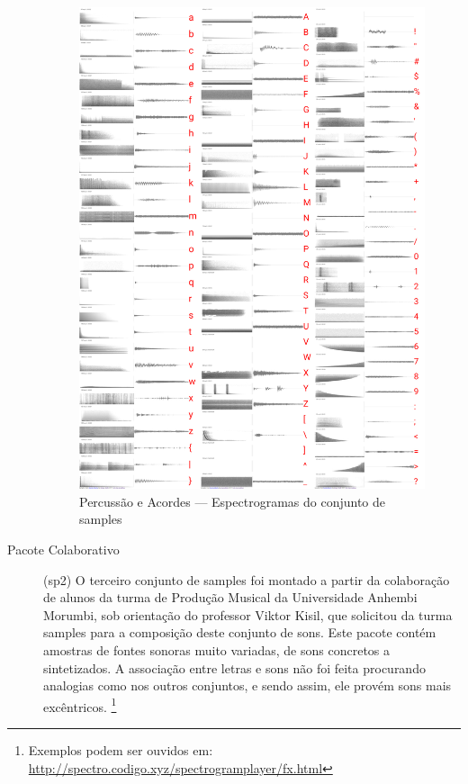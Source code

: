 \begin{description}
\begin{figure}
    \caption{\label{samplespercussao}Percussão e Acordes --- Espectrogramas do conjunto de samples}
    \begin{center}
        \includegraphics[width=1\linewidth]{pictures/cap3/bandapercussao.jpg}
    \end{center}
\end{figure}

\item[Pacote Colaborativo] (sp2) O terceiro conjunto de samples foi montado a partir da colaboração de alunos da turma de Produção Musical da Universidade Anhembi Morumbi, sob orientação do professor Viktor Kisil, que solicitou da turma samples para a composição deste conjunto de sons. Este pacote contém amostras de fontes sonoras muito variadas, de sons concretos a sintetizados. A associação entre letras e sons não foi feita procurando analogias como nos outros conjuntos, e sendo assim, ele provém sons mais excêntricos. \footnote{Exemplos podem ser ouvidos em: \url{http://spectro.codigo.xyz/spectrogramplayer/fx.html}} 


\end{description}
